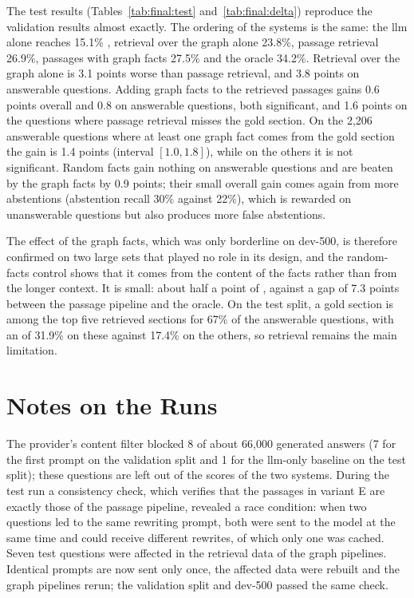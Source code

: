 The test results (Tables~\ref{tab:final:test} and~\ref{tab:final:delta}) reproduce the
validation results almost exactly. The ordering of the systems is the same: the
\gls{llm} alone reaches 15.1\% \fone{}, retrieval over the graph alone 23.8\%, passage
retrieval 26.9\%, passages with graph facts 27.5\% and the oracle 34.2\%. Retrieval over
the graph alone is 3.1 points worse than passage retrieval, and 3.8 points on answerable
questions. Adding graph facts to the retrieved passages gains 0.6 points overall and 0.8
on answerable questions, both significant, and 1.6 points on the questions where passage
retrieval misses the gold section. On the 2{,}206 answerable questions where at least one
graph fact comes from the gold section the gain is 1.4 points (interval $[1.0, 1.8]$),
while on the others it is not significant. Random facts gain nothing on answerable
questions and are beaten by the graph facts by 0.9 points; their small overall gain comes
again from more abstentions (abstention recall 30\% against 22\%), which is rewarded on
unanswerable questions but also produces more false abstentions.

The effect of the graph facts, which was only borderline on dev-500, is therefore
confirmed on two large sets that played no role in its design, and the random-facts
control shows that it comes from the content of the facts rather than from the longer
context. It is small: about half a point of \fone{}, against a gap of 7.3 points between
the passage pipeline and the oracle. On the test split, a gold section is among the top
five retrieved sections for 67\% of the answerable questions, with an \fone{} of 31.9\%
on these against 17.4\% on the others, so retrieval remains the main limitation.


\section{Notes on the Runs}\label{sec:final:notes}

The provider's content filter blocked 8 of about 66{,}000 generated answers (7 for the
first prompt on the validation split and 1 for the \gls{llm}-only baseline on the test
split); these questions are left out of the scores of the two systems. During the test
run a consistency check, which verifies that the passages in variant E are exactly those
of the passage pipeline, revealed a race condition: when two questions led to the same
rewriting prompt, both were sent to the model at the same time and could receive
different rewrites, of which only one was cached. Seven test questions were affected in
the retrieval data of the graph pipelines. Identical prompts are now sent only once, the
affected data were rebuilt and the graph pipelines rerun; the validation split and
dev-500 passed the same check.
